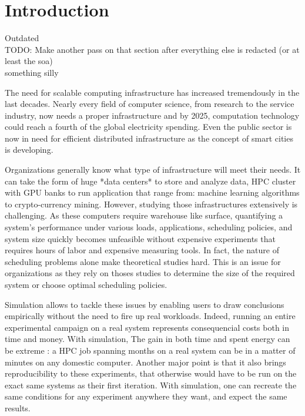 \chapter{Introduction}

Outdated\\ 

TODO: Make another pass on that section after everything else is redacted (or
at least the soa)\\

something silly

The need for scalable computing infrastructure has increased tremendously in
the last decades. Nearly every field of computer science, from research to the
service industry, now needs a proper infrastructure and by 2025, computation
technology could reach a fourth of the global electricity
spending\cite{andrae2017total}.  Even the public sector is now in need for
efficient distributed infrastructure as the concept of smart cities is
developing.

Organizations generally know what type of infrastructure will meet their needs.
It can take the form of huge *data centers* to store and analyze data,
HPC cluster with GPU banks to run application that range from:
machine learning algorithms to crypto-currency mining.  However, studying those
infrastructures extensively is challenging.  As these computers require
warehouse like surface\cite{barroso2018datacenter}, quantifying a
system's performance under various loads, applications, scheduling policies, and
system size quickly becomes unfeasible without expensive experiments that requires hours of labor and expensive measuring tools.
In fact, the nature of scheduling problems\cite{scheduler-complexity} alone
make theoretical studies hard.  This is an issue for organizations as they rely
on thoses studies to determine the size of the required system or choose
optimal scheduling
policies.\\




Simulation allows to tackle these issues by enabling users to draw conclusions
empirically without the need to fire up real workloads. Indeed, running an
entire experimental campaign on a real system represents consequencial costs
both in time and money. With simulation, The gain in both time and spent energy
can be extreme : a HPC job spanning months on a real system can be  in
a matter of minutes on any domestic computer.  Another major point is that it
also brings reproducibility to these experiments, that otherwise would have to
be run on the exact same systems as their first iteration. With simulation, one
can recreate the same conditions for any experiment anywhere they want, and
expect the same results.\\

